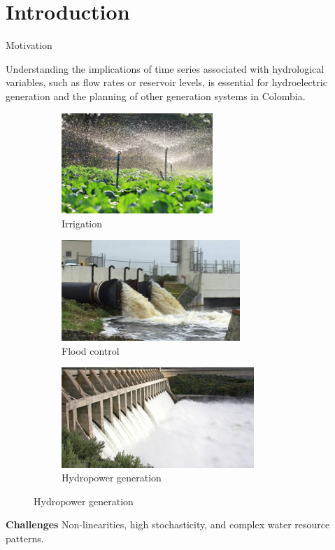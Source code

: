 \section{Introduction}
\begin{frame}{Motivation}
	\begin{block}{}
	Understanding the implications of time series associated with hydrological variables, such as flow rates or reservoir levels, is essential for hydroelectric generation and the planning of other generation systems in Colombia.
	\end{block}
	\begin{figure}
		\centering
		\begin{subfigure}[b]{0.3\textwidth}
			\centering
			\includegraphics[width=\textwidth, height=3.8cm]{images/irrigation.jpg}
			\caption{Irrigation}
		\end{subfigure}
		\hfill
		\begin{subfigure}[b]{0.3\textwidth}
			\centering
			\includegraphics[width=\textwidth, height=3.8cm]{images/flood_control.jpeg}
			\caption{Flood control}
		\end{subfigure}
		\hfill
		\begin{subfigure}[b]{0.3\textwidth}
			\centering
			\includegraphics[width=\textwidth, height=3.8cm]{images/hydro_gen.jpeg}
			\caption{Hydropower generation}
		\end{subfigure}
		
	\end{figure}
	\begin{block}{\textcolor{myNewColorB}{\textbf{Challenges}}}
	Non-linearities, high stochasticity, and complex water resource patterns.
	\end{block}
	
\end{frame}

